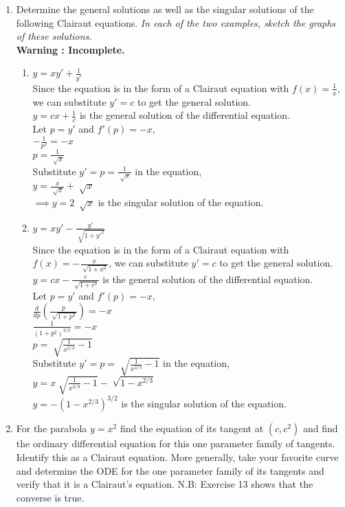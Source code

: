 \documentclass[a4paper]{article}
\begin{document}
\begin{enumerate}
\item{Determine the general solutions as well as the singular solutions of the following Clairaut equations.\textit{ In each of the two examples, sketch the graphs of these solutions.}
\\ \textbf{Warning : Incomplete.}
\begin{enumerate}
\item{$y=xy'+\frac{1}{y'}$
\\Since the equation is in the form of a Clairaut equation with $f(x)=\frac{1}{x}$, we can substitute $y'=c$ to get the general solution.
\\$y=cx+\frac{1}{c}$ is the general solution of the differential equation.
\\Let $p=y'$ and $f'(p)=-x$,
\\$-\frac{1}{p^2}=-x$
\\$p=\frac{1}{\sqrt[]{x}}$
\\Substitute $y'=p=\frac{1}{\sqrt[]{x}}$ in the equation,
\\$y=\frac{x}{\sqrt[]{x}}+\sqrt[]{x}$
\\$\implies y=2 \ \sqrt[]{x}$ is the singular solution of the equation.
}
\item{$y=xy'-\frac{y'}{\sqrt[]{1+y'^2}}$
\\Since the equation is in the form of a Clairaut equation with $f(x)=-\frac{x}{\sqrt[]{1+x^2}}$, we can substitute $y'=c$ to get the general solution.
\\$y=cx-\frac{c}{\sqrt[]{1+c^2}}$ is the general solution of the differential equation.
\\Let $p=y'$ and $f'(p)=-x$,
\\$\frac{d}{dp}(\frac{p}{\sqrt[]{1+p^2}})=-x$
\\$\frac{1}{(1+p^2)^{3/2}}=-x$
\\$p=\sqrt[]{\frac{1}{x^{2/3}}-1}$
\\Substitute $y'=p=\sqrt[]{\frac{1}{x^{2/3}}-1}$ in the equation,
\\$y=x\sqrt[]{\frac{1}{x^{2/3}}-1}-\sqrt[]{1-x^{2/3}}$
\\$y=-(1-x^{2/3})^{3/2}$ is the singular solution of the equation.
}
\end{enumerate}
}
\item{For the parabola $y=x^2$ find the equation of its tangent at $(c, c^2)$ and find the ordinary differential equation for this one parameter family of tangents. Identify this as a Clairaut equation. More generally, take your favorite curve and determine the ODE for the one parameter family of its tangents and verify that it is a Clairaut's equation. N.B: Exercise 13 shows that the converse is true.
}
\end{enumerate}
\end{document}
